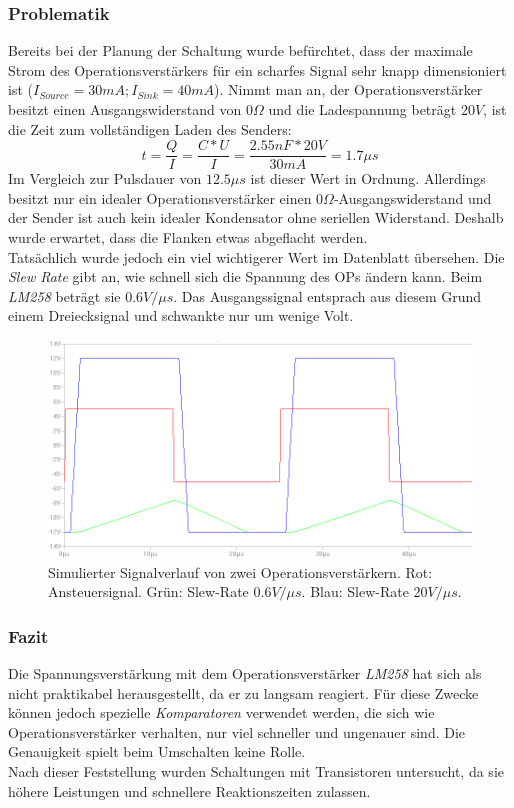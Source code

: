 \subsubsection{Problematik}
Bereits bei der Planung der Schaltung wurde befürchtet, dass der maximale Strom des Operationsverstärkers für ein scharfes Signal sehr knapp dimensioniert ist ($I_{Source}=30mA; I_{Sink}=40mA$). Nimmt man an, der Operationsverstärker besitzt einen Ausgangswiderstand von $0 \Omega$ und die Ladespannung beträgt $20V$, ist die Zeit zum vollständigen Laden des Senders:
\begin{equation}
t=\frac{Q}{I}=\frac{C*U}{I}=\frac{2.55nF*20V}{30mA}=1.7\mu s
\end{equation}
Im Vergleich zur Pulsdauer von $12.5\mu s$ ist dieser Wert in Ordnung. Allerdings besitzt nur ein idealer Operationsverstärker einen $0\Omega$-Ausgangswiderstand und der Sender ist auch kein idealer Kondensator ohne seriellen Widerstand. Deshalb wurde erwartet, dass die Flanken etwas abgeflacht werden.\\
Tatsächlich wurde jedoch ein viel wichtigerer Wert im Datenblatt übersehen. Die \textit{Slew Rate} gibt an, wie schnell sich die Spannung des OPs ändern kann. Beim \textit{LM258} beträgt sie $0.6V/\mu s$. Das Ausgangssignal entsprach aus diesem Grund einem Dreiecksignal und schwankte nur um wenige Volt.
\begin{figure}[H] %
\centering
\includegraphics[scale=0.6]{images/signalverlauf_opamps.png}
\caption{Simulierter Signalverlauf von zwei Operationsverstärkern. Rot: Ansteuersignal. Grün: Slew-Rate $0.6V/\mu s$. Blau: Slew-Rate $20V/\mu s$.} \label{img:I2}
\end{figure}

\subsubsection{Fazit}
Die Spannungsverstärkung mit dem Operationsverstärker \textit{LM258} hat sich als nicht praktikabel herausgestellt, da er zu langsam reagiert. Für diese Zwecke können jedoch spezielle \textit{Komparatoren} verwendet werden, die sich wie Operationsverstärker verhalten, nur viel schneller und ungenauer sind. Die Genauigkeit spielt beim Umschalten keine Rolle.\\
Nach dieser Feststellung wurden Schaltungen mit Transistoren untersucht, da sie höhere Leistungen und schnellere Reaktionszeiten zulassen.


